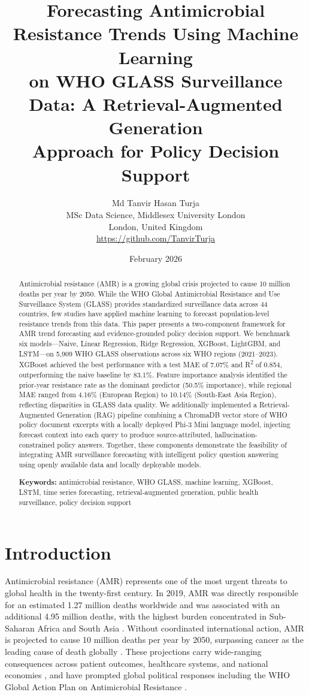 \documentclass[12pt]{article}
\title{%
  \textbf{Forecasting Antimicrobial Resistance Trends Using Machine Learning \\
  on WHO GLASS Surveillance Data: A Retrieval-Augmented Generation \\
  Approach for Policy Decision Support}
}
\author{
  Md Tanvir Hasan Turja \\
  MSc Data Science, Middlesex University London \\
  London, United Kingdom \\
  \url{https://github.com/TanvirTurja}
}
\date{February 2026}
\begin{document}
\maketitle

\begin{abstract}
Antimicrobial resistance (AMR) is a growing global crisis projected to cause 10 million deaths per year by 2050. While the WHO Global Antimicrobial Resistance and Use Surveillance System (GLASS) provides standardized surveillance data across 44 countries, few studies have applied machine learning to forecast population-level resistance trends from this data. This paper presents a two-component framework for AMR trend forecasting and evidence-grounded policy decision support. We benchmark six models---Naive, Linear Regression, Ridge Regression, XGBoost, LightGBM, and LSTM---on 5,909 WHO GLASS observations across six WHO regions (2021--2023). XGBoost achieved the best performance with a test MAE of 7.07\% and R\textsuperscript{2} of 0.854, outperforming the naive baseline by 83.1\%. Feature importance analysis identified the prior-year resistance rate as the dominant predictor (50.5\% importance), while regional MAE ranged from 4.16\% (European Region) to 10.14\% (South-East Asia Region), reflecting disparities in GLASS data quality. We additionally implemented a Retrieval-Augmented Generation (RAG) pipeline combining a ChromaDB vector store of WHO policy document excerpts with a locally deployed Phi-3 Mini language model, injecting forecast context into each query to produce source-attributed, hallucination-constrained policy answers. Together, these components demonstrate the feasibility of integrating AMR surveillance forecasting with intelligent policy question answering using openly available data and locally deployable models.

\noindent\textbf{Keywords:} antimicrobial resistance, WHO GLASS, machine learning, XGBoost, LSTM, time series forecasting, retrieval-augmented generation, public health surveillance, policy decision support
\end{abstract}

\section{Introduction}

Antimicrobial resistance (AMR) represents one of the most urgent threats to global health in the twenty-first century. In 2019, AMR was directly responsible for an estimated 1.27 million deaths worldwide and was associated with an additional 4.95 million deaths, with the highest burden concentrated in Sub-Saharan Africa and South Asia \citep{murray2022}. Without coordinated international action, AMR is projected to cause 10 million deaths per year by 2050, surpassing cancer as the leading cause of death globally \citep{oneill2016, dekraker2016}. These projections carry wide-ranging consequences across patient outcomes, healthcare systems, and national economies \citep{dadgostar2019, tang2023}, and have prompted global political responses including the WHO Global Action Plan on Antimicrobial Resistance \citep{who2015gap, sugden2016}.
\end{document}
